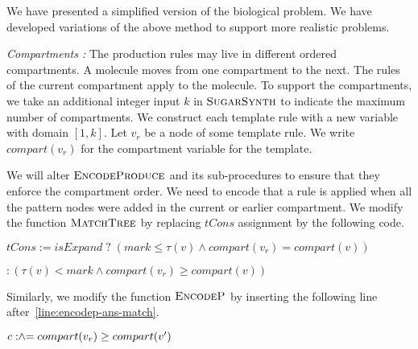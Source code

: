We have presented a simplified version of
the biological problem.
We have developed variations of the above method to support more realistic problems.


{\em Compartments : } The production rules may live in different ordered compartments.
A molecule moves from one compartment to the next.
The rules of the current compartment apply to the molecule.
To support the compartments, we take an additional integer
input $k$ in $\textsc{SugarSynth}$ to indicate the maximum number
of compartments.
We construct each template rule with a new variable with domain $[1,k]$.
Let $v_r$ be a node of some template rule. We write $compart(v_r)$
for the compartment variable for the template.

We will alter $\textsc{EncodeProduce}$ and its sub-procedures to
ensure that they enforce the compartment order.
We need to encode that a rule is applied when all the
pattern nodes were added in the current or earlier compartment.
We modify the function $\textsc{MatchTree}$ by replacing
$tCons$ assignment by the following code.\\
\begin{minipage}{1.0\linewidth}
\begin{algorithmic}[1]
  \State $tCons := isExpand \;?\; ( mark \leq \tau(v)  \land compart(v_r) = compart(v) )$\par
  \mbox{}\qquad\qquad\hspace{10mm} $:( \tau(v) < mark  \land compart(v_r) \geq compart(v) )$
\end{algorithmic}
\end{minipage}
Similarly, we modify the function
$\textsc{EncodeP}$ by inserting the following line after~\ref{line:encodep-ans-match}.\\
\begin{minipage}{1.0\linewidth}
\begin{algorithmic}[1]
  \State $c \mathrel{:\hspace{-3pt}\land\hspace{-3pt}=} compart(v_r) \geq compart(v')$
\end{algorithmic}  
\end{minipage}


